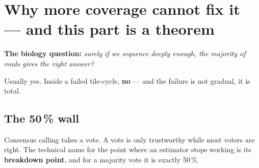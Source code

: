 \clearpage
\renewcommand{\sectioncolor}{ember}
\section{Why more coverage cannot fix it --- and this part is a theorem}

\noindent\textbf{\color{ember}The biology question:} \emph{surely if we sequence deeply enough, the
majority of reads gives the right answer?}

\noindent Usually yes. Inside a failed tile-cycle, \textbf{no} --- and the failure is not gradual, it
is total.

\subsection{The 50\,\% wall}

Consensus calling takes a vote. A vote is only trustworthy while most voters are right. The technical
name for the point where an estimator stops working is its \textbf{breakdown point}, and for a
majority vote it is exactly 50\,\%.

